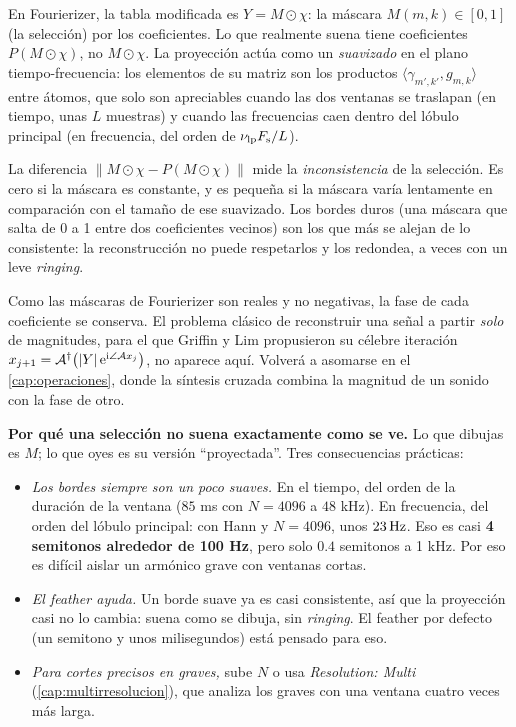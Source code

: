 En Fourierizer, la tabla modificada es $Y=M\odot\chi$: la máscara $M(m,k)\in[0,1]$ (la selección)
por los coeficientes. Lo que realmente suena tiene coeficientes $P(M\odot\chi)$, no $M\odot\chi$.
La proyección actúa como un \emph{suavizado} en el plano tiempo-frecuencia: los elementos de su
matriz son los productos $\langle\gamma_{m',k'},g_{m,k}\rangle$ entre átomos, que solo son
apreciables cuando las dos ventanas se traslapan (en tiempo, unas $L$ muestras) y cuando las
frecuencias caen dentro del lóbulo principal (en frecuencia, del orden de $\nu_{\text{lp}}F_{\mathrm{s}}/L$).

\begin{observacion}
La diferencia $\|M\odot\chi-P(M\odot\chi)\|$ mide la \emph{inconsistencia} de la selección.
Es cero si la máscara es constante, y es pequeña si la máscara varía lentamente en comparación con
el tamaño de ese suavizado. Los bordes duros (una máscara que salta de 0 a 1 entre dos
coeficientes vecinos) son los que más se alejan de lo consistente: la reconstrucción no puede
respetarlos y los redondea, a veces con un leve \emph{ringing}.
\end{observacion}

Como las máscaras de Fourierizer son reales y no negativas, la fase de cada coeficiente se
conserva. El problema clásico de reconstruir una señal a partir \emph{solo} de magnitudes, para el
que Griffin y Lim propusieron su célebre iteración $x_{j+1}=\mathcal A^{\dagger}\bigl(|Y|\,\mathrm{e}^{\mathrm{i}\angle\mathcal Ax_j}\bigr)$,
no aparece aquí. Volverá a asomarse en el \cref{cap:operaciones}, donde la síntesis cruzada
combina la magnitud de un sonido con la fase de otro.

\begin{estudio}
\textbf{Por qué una selección no suena exactamente como se ve.} Lo que dibujas es $M$; lo que oyes
es su versión ``proyectada''. Tres consecuencias prácticas:
\begin{itemize}
  \item \emph{Los bordes siempre son un poco suaves.} En el tiempo, del orden de la duración de la
        ventana ($85$ ms con $N=4096$ a $48$ kHz). En frecuencia, del orden del lóbulo principal:
        con Hann y $N=4096$, unos $23\,\mathrm{Hz}$. Eso es casi \textbf{4 semitonos alrededor de 100 Hz},
        pero solo $0.4$ semitonos a 1 kHz. Por eso es difícil aislar un armónico grave con
        ventanas cortas.
  \item \emph{El feather ayuda.} Un borde suave ya es casi consistente, así que la proyección casi
        no lo cambia: suena como se dibuja, sin \emph{ringing}. El feather por defecto (un
        semitono y unos milisegundos) está pensado para eso.
  \item \emph{Para cortes precisos en graves,} sube $N$ o usa \emph{Resolution: Multi}
        (\cref{cap:multirresolucion}), que analiza los graves con una ventana cuatro veces más
        larga.
\end{itemize}
\end{estudio}

